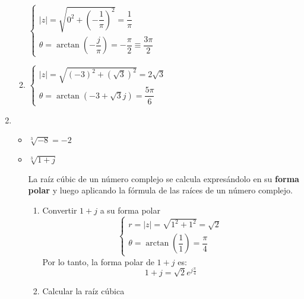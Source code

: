 \begin{enumerate}[label=\color{red}\textbf{\arabic*)}]
\begin{enumerate}[label=\color{red}\textbf{\textbf{\textbf{\alph*)}}}]
                $\begin{cases}
                    |z|=\sqrt{0^2+\left( -\dfrac{1}{\pi} \right)^2 }=\dfrac{1}{\pi}\\
                    \theta=\arctan\left( -\dfrac{j}{\pi} \right) =-\dfrac{\pi}{2}\equiv \dfrac{3\pi}{2}
                \end{cases}$
            \item {} 

                $\begin{cases}
                    |z|=\sqrt{(-3)^2+(\sqrt{3})^2}=2\sqrt{3}\\
                    \theta=\arctan(-3+\sqrt{3} j)=\dfrac{5\pi}{6}
                \end{cases}$
        \end{enumerate}
    \item {} 

        \begin{itemize}[label=\textbullet]
            \item $\sqrt[3]{-8}=-2 $ 
            \item $\sqrt[3]{1+j}$

                La raíz cúbic de un número complejo se calcula expresándolo en su \textbf{forma polar} y luego aplicando la fórmula de las raíces de un número complejo.
                \begin{enumerate}[label=Paso \arabic*:]
                    \item Convertir $1+j$ a su forma polar  \[
                    \begin{cases}
                        r=|z|=\sqrt{1^2+1^2}=\sqrt{2}\\
                        \theta=\arctan\left( \dfrac{1}{1} \right) =\dfrac{\pi}{4}
                    \end{cases}
                    \] 
                    Por lo tanto, la forma polar de $1+j$ es:  \[
                    1+j=\sqrt{2}e^{j\frac{\pi}{4} }  
                    \] 
                \item Calcular la raíz cúbica


\end{enumerate}
\end{itemize}
\end{enumerate}
